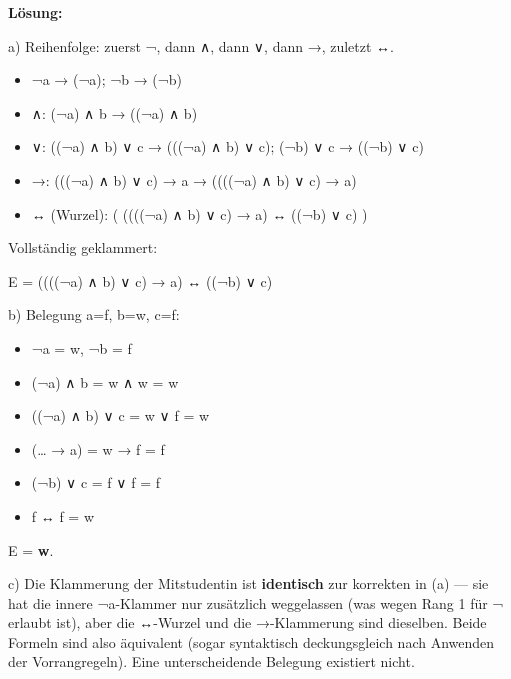 \documentclass[11pt, a4paper]{article}
\begin{document}
\textbf{Lösung:}


a) Reihenfolge: zuerst ¬, dann ∧, dann ∨, dann →, zuletzt ↔.

\begin{itemize}
  \item ¬a → (¬a); ¬b → (¬b)
  \item ∧: (¬a) ∧ b → ((¬a) ∧ b)
  \item ∨: ((¬a) ∧ b) ∨ c → (((¬a) ∧ b) ∨ c); (¬b) ∨ c → ((¬b) ∨ c)
  \item →: (((¬a) ∧ b) ∨ c) → a → ((((¬a) ∧ b) ∨ c) → a)
  \item ↔ (Wurzel): ( ((((¬a) ∧ b) ∨ c) → a) ↔ ((¬b) ∨ c) )
\end{itemize}

Vollständig geklammert:

E = ((((¬a) ∧ b) ∨ c) → a) ↔ ((¬b) ∨ c)


b) Belegung a=f, b=w, c=f:

\begin{itemize}
  \item ¬a = w, ¬b = f
  \item (¬a) ∧ b = w ∧ w = w
  \item ((¬a) ∧ b) ∨ c = w ∨ f = w
  \item (… → a) = w → f = f
  \item (¬b) ∨ c = f ∨ f = f
  \item f ↔ f = w
\end{itemize}

E = \textbf{w}.


c) Die Klammerung der Mitstudentin ist \textbf{identisch} zur korrekten in (a) — sie hat die innere ¬a-Klammer nur zusätzlich weggelassen (was wegen Rang 1 für ¬ erlaubt ist), aber die ↔-Wurzel und die →-Klammerung sind dieselben. Beide Formeln sind also äquivalent (sogar syntaktisch deckungsgleich nach Anwenden der Vorrangregeln). Eine unterscheidende Belegung existiert nicht.





\end{document}
